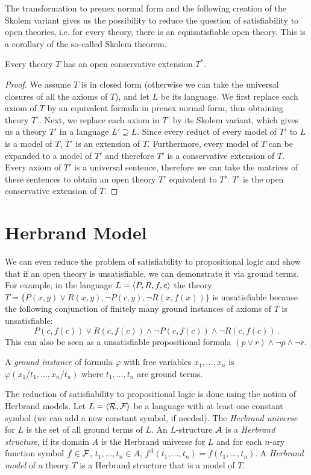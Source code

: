 The transformation to prenex normal form and the following creation of the Skolem variant gives us the possibility to reduce the question of satisfiability to open theories, i.e. for every theory, there is an equisatisfiable open theory. This is a corollary of the so-called Skolem theorem.

\begin{theorem}[Skolem]
Every theory $T$ has an open conservative extension $T^*$.
\end{theorem}
\begin{proof}
We assume $T$ is in closed form (otherwise we can take the universal closures of all the axioms of $T$), and let $L$ be its language. We first replace each axiom of $T$ by an equivalent formula in prenex normal form, thus obtaining theory $T^\circ$. Next, we replace each axiom in $T^\circ$ by its Skolem variant, which gives us a theory $T'$ in a language $L' \supseteq L$. Since every reduct of every model of $T'$ to $L$ is a model of $T$, $T'$ is an extension of $T$. Furthermore, every model of $T$ can be expanded to a model of $T'$ and therefore $T'$ is a conservative extension of $T$. Every axiom of $T'$ is a universal sentence, therefore we can take the matrices of these sentences to obtain an open theory $T^\circ$ equivalent to $T'$. $T^\circ$ is the open conservative extension of $T$.
\end{proof}

\section{Herbrand Model}

We can even reduce the problem of satisfiability to propositional logic and show that if an open theory is unsatisfiable, we can demonstrate it via ground terms. For example, in the language $L = \langle P, R, f, c \rangle$ the theory $T=\{P(x,y) \lor R(x,y), \neg P(c,y), \neg R(x, f(x))\}$ is unsatisfiable because the following conjunction of finitely many ground instances of axioms of $T$ is unsatisfiable: $$P(c, f(c)) \lor R(c, f(c)) \land \neg P(c, f(c)) \land \neg R(c, f(c))\,.$$ This can also be seen as a unsatisfiable propositional formula $(p \lor r) \land \neg p \land \neg r$.

A \emph{ground instance} of formula $\varphi$ with free variables $x_1, \dots, x_n$ is $\varphi(x_1/t_1, \dots, x_n/t_n)$ where $t_1, \dots, t_n$ are ground terms.

The reduction of satisfiability to propositional logic is done using the notion of Herbrand models. Let $L = \langle \mathcal{R}, \mathcal{F} \rangle$ be a language with at least one constant symbol (we can add a new constant symbol, if needed). The \emph{Herbrand universe} for $L$ is the set of all ground terms of $L$. An $L$-structure $\mathcal{A}$ is a \emph{Herbrand structure}, if its domain $A$ is the Herbrand universe for $L$ and for each $n$-ary function symbol $f \in \mathcal{F}$, $t_1, \dots, t_n \in A$, $f^A(t_1, \dots, t_n) = f(t_1, \dots, t_n)$. A \emph{Herbrand model} of a theory $T$ is a Herbrand structure that is a model of $T$.

